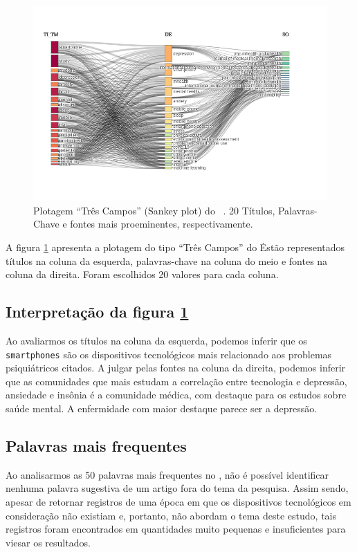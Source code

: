 \begin{figure}
    \centering
    \includegraphics[angle=0,width=1\textwidth]{experiments/GustavoMacCar/AnaliseBibliometrica/PsychDiseasesTech/sankey.png}
    \caption{Plotagem ``Três Campos'' (Sankey plot) do \dataset\ . 20 Títulos, Palavras-Chave e fontes mais proeminentes, respectivamente.}
    \label{fig:sankey:psych}
\end{figure}

A figura \ref{fig:sankey:psych} apresenta a plotagem do tipo ``Três Campos'' do \dataset\. Estão representados títulos na coluna da esquerda, palavras-chave na coluna do meio e fontes na coluna da direita. Foram escolhidos 20 valores para cada coluna.

\subsection{Interpretação da figura \ref{fig:sankey:psych}}
Ao avaliarmos os títulos na coluna da esquerda, podemos inferir que os \texttt{smartphones} são os dispositivos tecnológicos mais relacionado aos problemas psiquiátricos citados. A julgar pelas fontes na coluna da direita, podemos inferir que as comunidades que mais 
estudam a correlação entre tecnologia e depressão, ansiedade e insônia é a comunidade médica, com destaque para os estudos sobre saúde mental. A enfermidade com maior destaque parece ser a depressão.

\subsection{Palavras mais frequentes}

Ao analisarmos as 50 palavras mais frequentes no \dataset, não é possível identificar nenhuma palavra sugestiva de um artigo fora do tema da pesquisa. Assim sendo, apesar de retornar registros de uma época em que os dispositivos tecnológicos em consideração não existiam e, portanto,
não abordam o tema deste estudo, tais registros foram encontrados em quantidades muito pequenas e insuficientes para viesar os resultados.

